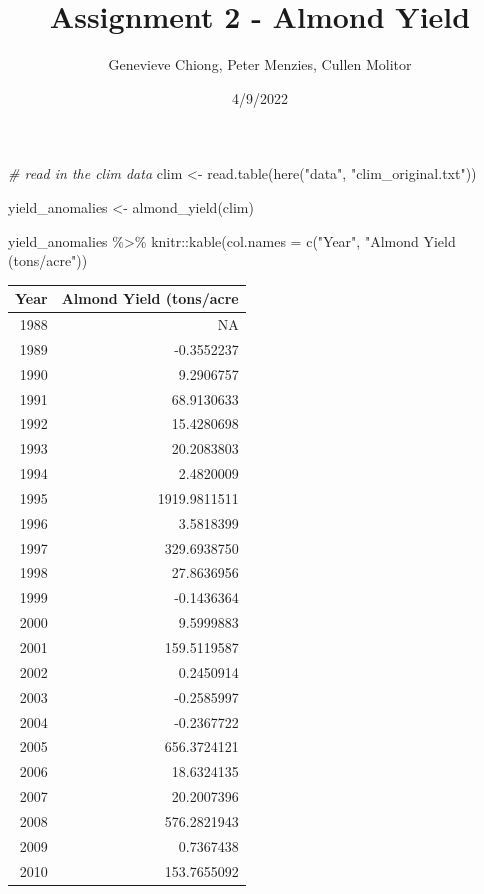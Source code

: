\documentclass[
]{article}
\title{Assignment 2 - Almond Yield}
\author{Genevieve Chiong, Peter Menzies, Cullen Molitor}
\date{4/9/2022}
\newenvironment{Shaded}{\begin{snugshade}}{\end{snugshade}}
\newcommand{\AttributeTok}[1]{\textcolor[rgb]{0.77,0.63,0.00}{#1}}
\newcommand{\CommentTok}[1]{\textcolor[rgb]{0.56,0.35,0.01}{\textit{#1}}}
\newcommand{\FunctionTok}[1]{\textcolor[rgb]{0.00,0.00,0.00}{#1}}
\newcommand{\NormalTok}[1]{#1}
\newcommand{\OtherTok}[1]{\textcolor[rgb]{0.56,0.35,0.01}{#1}}
\newcommand{\SpecialCharTok}[1]{\textcolor[rgb]{0.00,0.00,0.00}{#1}}
\newcommand{\StringTok}[1]{\textcolor[rgb]{0.31,0.60,0.02}{#1}}
\begin{document}
\maketitle

\begin{Shaded}
\begin{Highlighting}[]
\CommentTok{\# read in the clim data }
\NormalTok{clim }\OtherTok{\textless{}{-}} \FunctionTok{read.table}\NormalTok{(}\FunctionTok{here}\NormalTok{(}\StringTok{"data"}\NormalTok{, }\StringTok{"clim\_original.txt"}\NormalTok{))}
\end{Highlighting}
\end{Shaded}

\begin{Shaded}
\begin{Highlighting}[]
\NormalTok{yield\_anomalies }\OtherTok{\textless{}{-}} \FunctionTok{almond\_yield}\NormalTok{(clim) }

\NormalTok{yield\_anomalies }\SpecialCharTok{\%\textgreater{}\%}\NormalTok{ knitr}\SpecialCharTok{::}\FunctionTok{kable}\NormalTok{(}\AttributeTok{col.names =} \FunctionTok{c}\NormalTok{(}\StringTok{"Year"}\NormalTok{,}
                                               \StringTok{"Almond Yield (tons/acre"}\NormalTok{))}
\end{Highlighting}
\end{Shaded}

\begin{longtable}[]{@{}rr@{}}
\toprule
Year & Almond Yield (tons/acre \\
\midrule
\endhead
1988 & NA \\
1989 & -0.3552237 \\
1990 & 9.2906757 \\
1991 & 68.9130633 \\
1992 & 15.4280698 \\
1993 & 20.2083803 \\
1994 & 2.4820009 \\
1995 & 1919.9811511 \\
1996 & 3.5818399 \\
1997 & 329.6938750 \\
1998 & 27.8636956 \\
1999 & -0.1436364 \\
2000 & 9.5999883 \\
2001 & 159.5119587 \\
2002 & 0.2450914 \\
2003 & -0.2585997 \\
2004 & -0.2367722 \\
2005 & 656.3724121 \\
2006 & 18.6324135 \\
2007 & 20.2007396 \\
2008 & 576.2821943 \\
2009 & 0.7367438 \\
2010 & 153.7655092 \\
\bottomrule
\end{longtable}
\end{document}
